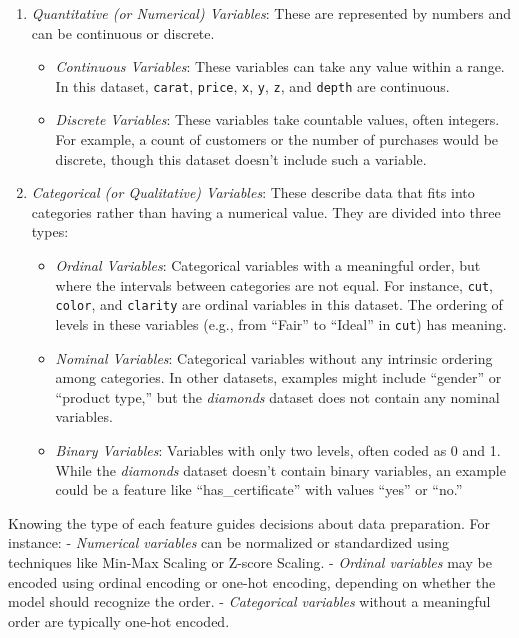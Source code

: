 \documentclass[
]{book}
\newcommand{\passthrough}[1]{#1}
\providecommand{\tightlist}{%
  \setlength{\itemsep}{0pt}\setlength{\parskip}{0pt}}
\theoremstyle{definition}
\theoremstyle{definition}
\theoremstyle{definition}
\theoremstyle{definition}
\theoremstyle{remark}
\begin{document}
\begin{enumerate}
\def\labelenumi{\arabic{enumi}.}
\tightlist
\item
  \emph{Quantitative (or Numerical) Variables}: These are represented by numbers and can be continuous or discrete.

  \begin{itemize}
  \tightlist
  \item
    \emph{Continuous Variables}: These variables can take any value within a range. In this dataset, \passthrough{\lstinline!carat!}, \passthrough{\lstinline!price!}, \passthrough{\lstinline!x!}, \passthrough{\lstinline!y!}, \passthrough{\lstinline!z!}, and \passthrough{\lstinline!depth!} are continuous.
  \item
    \emph{Discrete Variables}: These variables take countable values, often integers. For example, a count of customers or the number of purchases would be discrete, though this dataset doesn't include such a variable.
  \end{itemize}
\item
  \emph{Categorical (or Qualitative) Variables}: These describe data that fits into categories rather than having a numerical value. They are divided into three types:

  \begin{itemize}
  \tightlist
  \item
    \emph{Ordinal Variables}: Categorical variables with a meaningful order, but where the intervals between categories are not equal. For instance, \passthrough{\lstinline!cut!}, \passthrough{\lstinline!color!}, and \passthrough{\lstinline!clarity!} are ordinal variables in this dataset. The ordering of levels in these variables (e.g., from ``Fair'' to ``Ideal'' in \passthrough{\lstinline!cut!}) has meaning.
  \item
    \emph{Nominal Variables}: Categorical variables without any intrinsic ordering among categories. In other datasets, examples might include ``gender'' or ``product type,'' but the \emph{diamonds} dataset does not contain any nominal variables.
  \item
    \emph{Binary Variables}: Variables with only two levels, often coded as 0 and 1. While the \emph{diamonds} dataset doesn't contain binary variables, an example could be a feature like ``has\_certificate'' with values ``yes'' or ``no.''
  \end{itemize}
\end{enumerate}

Knowing the type of each feature guides decisions about data preparation. For instance:
- \emph{Numerical variables} can be normalized or standardized using techniques like Min-Max Scaling or Z-score Scaling.
- \emph{Ordinal variables} may be encoded using ordinal encoding or one-hot encoding, depending on whether the model should recognize the order.
- \emph{Categorical variables} without a meaningful order are typically one-hot encoded.
\end{document}
